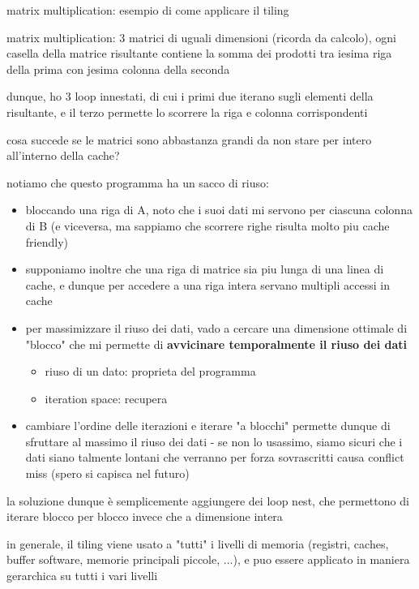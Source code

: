 matrix multiplication: esempio di come applicare il tiling
\begin{example}
  matrix multiplication: 3 matrici di uguali dimensioni (ricorda da calcolo), ogni casella della matrice risultante contiene la somma dei prodotti tra iesima riga della prima con jesima colonna della seconda

  dunque, ho 3 loop innestati, di cui i primi due iterano sugli elementi della risultante, e il terzo permette lo scorrere la riga e colonna corrispondenti

  cosa succede se le matrici sono abbastanza grandi da non stare per intero all'interno della cache?

  notiamo che questo programma ha un sacco di riuso:
  \begin{itemize}
    \item bloccando una riga di A, noto che i suoi dati mi servono per ciascuna colonna di B (e viceversa, ma sappiamo che scorrere righe risulta molto piu cache friendly)
    \item supponiamo inoltre che una riga di matrice sia piu lunga di una linea di cache, e dunque per accedere a una riga intera servano multipli accessi in cache
    \item per massimizzare il riuso dei dati, vado a cercare una dimensione ottimale di "blocco" che mi permette di \textbf{avvicinare temporalmente il riuso dei dati}
      \begin{itemize}
        \item riuso di un dato: proprieta del programma
        \item iteration space: recupera
      \end{itemize}

    \item cambiare l'ordine delle iterazioni e iterare "a blocchi" permette dunque di sfruttare al massimo il riuso dei dati - se non lo usassimo, siamo sicuri che i dati siano talmente lontani che verranno per forza sovrascritti causa conflict miss (spero si capisca nel futuro)
  \end{itemize}

  la soluzione dunque \`e semplicemente aggiungere dei loop nest, che permettono di iterare blocco per blocco invece che a dimensione intera

\end{example}

in generale, il tiling viene usato a "tutti" i livelli di memoria (registri, caches, buffer software, memorie principali piccole, ...), e puo essere applicato in maniera gerarchica su tutti i vari livelli

